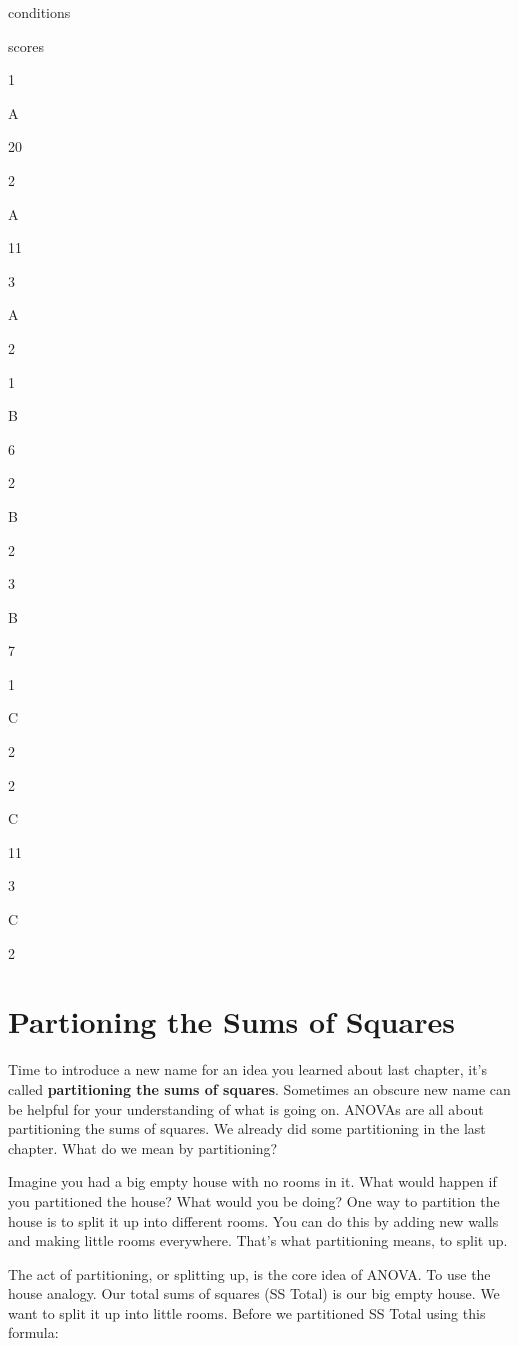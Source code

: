 \documentclass[
]{book}
\begin{document}
conditions

scores

1

A

20

2

A

11

3

A

2

1

B

6

2

B

2

3

B

7

1

C

2

2

C

11

3

C

2

\hypertarget{partioning-the-sums-of-squares}{%
\section{Partioning the Sums of Squares}\label{partioning-the-sums-of-squares}}

Time to introduce a new name for an idea you learned about last chapter, it's called \textbf{partitioning the sums of squares}. Sometimes an obscure new name can be helpful for your understanding of what is going on. ANOVAs are all about partitioning the sums of squares. We already did some partitioning in the last chapter. What do we mean by partitioning?

Imagine you had a big empty house with no rooms in it. What would happen if you partitioned the house? What would you be doing? One way to partition the house is to split it up into different rooms. You can do this by adding new walls and making little rooms everywhere. That's what partitioning means, to split up.

The act of partitioning, or splitting up, is the core idea of ANOVA. To use the house analogy. Our total sums of squares (SS Total) is our big empty house. We want to split it up into little rooms. Before we partitioned SS Total using this formula:
\end{document}
